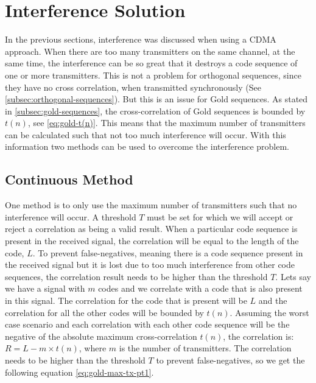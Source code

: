 
\section{Interference Solution}
\label{sec:interference-solution}

In the previous sections, interference was discussed when using a CDMA approach.
When there are too many transmitters on the same channel, at the same time, the interference can be so great that it destroys a code sequence of one or more transmitters.
This is not a problem for orthogonal sequences, since they have no cross correlation, when transmitted synchronously (See \autoref{subsec:orthogonal-sequences}).
But this is an issue for Gold sequences. 
As stated in \autoref{subsec:gold-sequences}, the cross-correlation of Gold sequences is bounded by $t(n)$, see \autoref{eq:gold-t(n)}.
This means that the maximum number of transmitters can be calculated such that not too much interference will occur. 
With this information two methods can be used to overcome the interference problem.



\subsection{Continuous Method}
\label{subsec:continuous-method-modulation}


One method is to only use the maximum number of transmitters such that no interference will occur.
A threshold $T$ must be set for which we will accept or reject a correlation as being a valid result.
When a particular code sequence is present in the received signal, the correlation will be equal to the length of the code, $L$.
To prevent false-negatives, meaning there is a code sequence present in the received signal but it is lost due to too much interference from other code sequences, the correlation result needs to be higher than the threshold $T$.
Lets say we have a signal with $m$ codes and we correlate with a code that is also present in this signal.
The correlation for the code that is present will be $L$ and the correlation for all the other codes will be bounded by $t(n)$.
Assuming the worst case scenario and each correlation with each other code sequence will be the negative of the absolute maximum cross-correlation $t(n)$, the correlation is: $R = L - m \times t(n)$, where $m$ is the number of transmitters.
The correlation needs to be higher than the threshold $T$ to prevent false-negatives, so we get the following equation \autoref{eq:gold-max-tx-pt1}.

